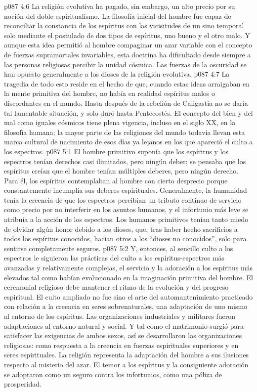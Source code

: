 \vs p087 4:6 La religión evolutiva ha pagado, sin embargo, un alto precio por su noción del doble espiritualismo. La filosofía inicial del hombre fue capaz de reconciliar la constancia de los espíritus con las vicisitudes de un sino temporal solo mediante el postulado de dos tipos de espíritus, uno bueno y el otro malo. Y aunque esta idea permitió al hombre compaginar un azar variable con el concepto de fuerzas supramortales invariables, esta doctrina ha dificultado desde siempre a las personas religiosas percibir la unidad cósmica. Las fuerzas de la oscuridad se han opuesto generalmente a los dioses de la religión evolutiva.
\vs p087 4:7 La tragedia de todo esto reside en el hecho de que, cuando estas ideas arraigaban en la mente primitiva del hombre, no había en realidad espíritus malos o discordantes en el mundo. Hasta después de la rebelión de Caligastia no se daría tal lamentable situación, y solo duró hasta Pentecostés. El concepto del bien y del mal como iguales cósmicos tiene plena vigencia, incluso en el siglo XX, en la filosofía humana; la mayor parte de las religiones del mundo todavía llevan esta marca cultural de nacimiento de esos días ya lejanos en los que apareció el culto a los espectros.
\vs p087 5:1 El hombre primitivo suponía que los espíritus y los espectros tenían derechos casi ilimitados, pero ningún deber; se pensaba que los espíritus creían que el hombre tenían múltiples deberes, pero ningún derecho. Para él, los espíritus contemplaban al hombre con cierto desprecio porque constantemente incumplía sus deberes espirituales. Generalmente, la humanidad tenía la creencia de que los espectros percibían un tributo continuo de servicio como precio por no interferir en los asuntos humanos, y el infortunio más leve se atribuía a la acción de los espectros. Los humanos primitivos tenían tanto miedo de olvidar algún honor debido a los dioses, que, tras haber hecho sacrificios a todos los espíritus conocidos, hacían otros a los “dioses no conocidos”, solo para sentirse completamente seguros.
\vs p087 5:2 Y, entonces, al sencillo culto a los espectros le siguieron las prácticas del culto a los espíritus\hyp{}espectros más avanzadas y relativamente complejas, el servicio y la adoración a los espíritus más elevados tal como habían evolucionado en la imaginación primitiva del hombre. El ceremonial religioso debe mantener el ritmo de la evolución y del progreso espiritual. El culto ampliado no fue sino el arte del automantenimiento practicado con relación a la creencia en seres sobrenaturales, una adaptación de uno mismo al entorno de los espíritus. Las organizaciones industriales y militares fueron adaptaciones al entorno natural y social. Y tal como el matrimonio surgió para satisfacer las exigencias de ambos sexos, así se desarrollaron las organizaciones religiosas: como respuesta a la creencia en fuerzas espirituales superiores y en seres espirituales. La religión representa la adaptación del hombre a sus ilusiones respecto al misterio del azar. El temor a los espíritus y la consiguiente adoración se adoptaron como un seguro contra los infortunios, como una póliza de prosperidad.
